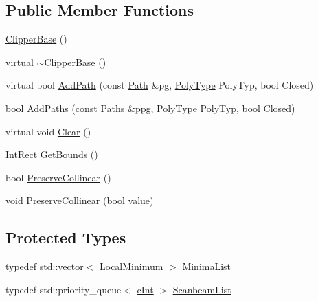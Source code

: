 \subsection*{Public Member Functions}
\begin{DoxyCompactItemize}
\item 
\mbox{\hyperlink{class_clipper_lib_1_1_clipper_base_ab7144fc592427238c55ae81061e895a2}{Clipper\+Base}} ()
\item 
virtual \mbox{\hyperlink{class_clipper_lib_1_1_clipper_base_ae73a6a12fb3e7e62b59d1ff38135b27c}{$\sim$\+Clipper\+Base}} ()
\item 
virtual bool \mbox{\hyperlink{class_clipper_lib_1_1_clipper_base_a7545ac6e146894dc8416887eadd01dba}{Add\+Path}} (const \mbox{\hyperlink{namespace_clipper_lib_af39c8fe00f278f18cc8142fef41242da}{Path}} \&pg, \mbox{\hyperlink{namespace_clipper_lib_a50d662440e5e100070014ed91281e960}{Poly\+Type}} Poly\+Typ, bool Closed)
\item 
bool \mbox{\hyperlink{class_clipper_lib_1_1_clipper_base_a2395967b47fb9f3f5846e2bf56c18f67}{Add\+Paths}} (const \mbox{\hyperlink{namespace_clipper_lib_a4bab1d9e10805fa6f1fd3b78c56efcfe}{Paths}} \&ppg, \mbox{\hyperlink{namespace_clipper_lib_a50d662440e5e100070014ed91281e960}{Poly\+Type}} Poly\+Typ, bool Closed)
\item 
virtual void \mbox{\hyperlink{class_clipper_lib_1_1_clipper_base_a5690952fe8c2cb047025566405827821}{Clear}} ()
\item 
\mbox{\hyperlink{struct_clipper_lib_1_1_int_rect}{Int\+Rect}} \mbox{\hyperlink{class_clipper_lib_1_1_clipper_base_a5590a5454248ac3f6beeba7f9690f62e}{Get\+Bounds}} ()
\item 
bool \mbox{\hyperlink{class_clipper_lib_1_1_clipper_base_a95c47199aeb139b13059968bc6056f44}{Preserve\+Collinear}} ()
\item 
void \mbox{\hyperlink{class_clipper_lib_1_1_clipper_base_aa827cfffd9be40dba7d503a3da708b91}{Preserve\+Collinear}} (bool value)
\end{DoxyCompactItemize}
\subsection*{Protected Types}
\begin{DoxyCompactItemize}
\item 
typedef std\+::vector$<$ \mbox{\hyperlink{struct_clipper_lib_1_1_local_minimum}{Local\+Minimum}} $>$ \mbox{\hyperlink{class_clipper_lib_1_1_clipper_base_addb22572066d3983dcd5797c542df00b}{Minima\+List}}
\item 
typedef std\+::priority\+\_\+queue$<$ \mbox{\hyperlink{namespace_clipper_lib_a7156730a24951629192d4831334bafaa}{c\+Int}} $>$ \mbox{\hyperlink{class_clipper_lib_1_1_clipper_base_a517d04b2a0f0bae13a64a819b3bd429e}{Scanbeam\+List}}
\end{DoxyCompactItemize}
